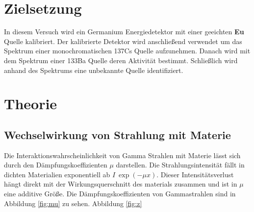\section{Zielsetzung}
In diesem Versuch wird ein Germanium Energiedetektor mit einer geeichten
\textbf{Eu} Quelle kalibriert. Der kalibrierte Detektor wird anschließend
verwendet um das Spektrum einer monochromatischen 137Cs Quelle aufzunehmen.
Danach wird mit dem Spektrum einer 133Ba Quelle deren Aktivität bestimmt.
Schließlich wird anhand des Spektrums eine unbekannte Quelle identifiziert.



\section{Theorie}
\subsection[]{Wechselwirkung von Strahlung mit Materie}
Die Interaktionswahrscheinlichkeit von Gamma Strahlen mit Materie lässt sich
durch den Dämpfungskoeffizienten $\mu$ darstellen. Die Strahlungsintensität
fällt in dichten Materialien exponentiell ab $I ~ \exp(-\mu x)$. Dieser
Intensitätsverlust hängt direkt mit der Wirkungsquerschnitt des materials
zusammen und ist in $\mu$ eine additive Größe. Die Dämpfungskoeffizienten von
Gammastrahlen sind in Abbildung \ref{fig:mu} zu sehen. Abbildung \ref{fig:z}


